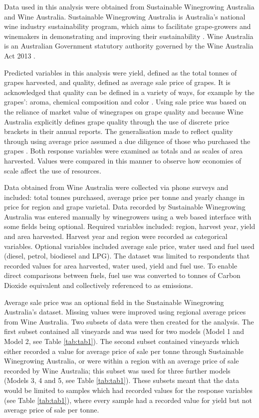 \documentclass[review,12pt,authoryear]{elsarticle}
\begin{document}
\begin{linenumbers}
Data used in this analysis were obtained from Sustainable Winegrowing Australia and Wine Australia. Sustainable Winegrowing Australia is Australia's national wine industry sustainability program, which aims to facilitate grape-growers and winemakers in demonstrating and improving their sustainability \citep{swaSustainableWingrowingAustralia2022}. Wine Australia is an Australian Government statutory authority governed by the Wine Australia Act 2013 \citep{WineAustraliaAct2019}.
\par
Predicted variables in this analysis were yield, defined as the total tonnes of grapes harvested, and quality, defined as average sale price of grapes. It is acknowledged that quality can be defined in a variety of ways, for example by the grapes': aroma, chemical composition and color \citep{kasimatiPredictingGrapeSugar2022,mejeanperrotDecisionsupportSystemPredict2022,suarezAssessingWineGrape2021}. Using sale price was based on the reliance of market value of winegrapes on grape quality and because Wine Australia explicitly defines grape quality through the use of discrete price brackets in their annual reports. The generalisation made to reflect quality through using average price assumed a due diligence of those who purchased the grapes \citep{yeggeInfluenceSensoryNonsensory2001}. Both response variables were examined as totals and as scales of area harvested. Values were compared in this manner to observe how economies of scale affect the use of resources.
\par
Data obtained from Wine Australia were collected via phone surveys and included: total tonnes purchased, average price per tonne and yearly change in price for region and grape varietal. Data recorded by Sustainable Winegrowing Australia was entered manually by winegrowers using a web based interface with some fields being optional. Required variables included: region, harvest year, yield and area harvested. Harvest year and region were recorded as categorical variables. Optional variables included average sale price, water used and fuel used (diesel, petrol, biodiesel and LPG). The dataset was limited to respondents that recorded values for area harvested, water used, yield and fuel use. To enable direct comparisons between fuels, fuel use was converted to tonnes of Carbon Dioxide equivalent and collectively referenced to as emissions.
\par
Average sale price was an optional field in the Sustainable Winegrowing Australia's dataset. Missing values were improved using regional average prices from Wine Australia. Two subsets of data were then created for the analysis. The first subset contained all vineyards and was used for two models (Model 1 and Model 2, see Table \ref{tab:tab1}). The second subset contained vineyards which either recorded a value for average price of sale per tonne through Sustainable Winegrowing Australia, or were within a region with an average price of sale recorded by Wine Australia; this subset was used for three further models (Models 3, 4 and 5, see Table \ref{tab:tab1}). These subsets meant that the data would be limited to samples which had recorded values for the response variables (see Table \ref{tab:tab1}), where every sample had a recorded value for yield but not average price of sale per tonne.

\end{linenumbers}
\end{document}
